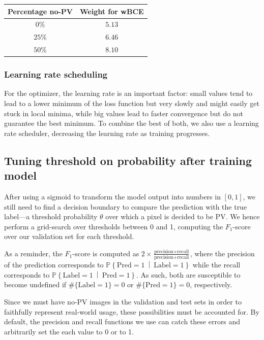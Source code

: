 \documentclass[10pt,conference]{IEEEtran}
\renewcommand\P[1]{\mathbb{P}\!\left\{#1\right\}}
\newcommand\given{\:\middle|\:}
\newcommand\tl[1]{\{\text{Label} = #1\}}
\newcommand\pl[1]{\{\text{Pred} = #1\}}
\begin{document}
\begin{center}
    \begin{tabular}{||c | c||} 
        \hline
        Percentage no-PV & Weight for wBCE\\ [0.5ex] 
        \hline\hline
        $0\%$ & $5.13$ \\
        \hline
        $25\%$ & $6.46$ \\
        \hline
        $50\%$ & $8.10$ \\
        \hline
    \end{tabular}
\end{center}

\subsubsection{Learning rate scheduling}
For the optimizer, the learning rate is an important factor:
small values tend to lead to a lower minimum of the loss function but very slowly and might easily get stuck in local minima, while big values lead to faster convergence but do not guarantee the best minimum.
To combine the best of both, we also use a learning rate scheduler, decreasing the learning rate as training progresses.

\subsection{Tuning threshold on probability after training model} \label{ssec:threshold}
After using a sigmoid to transform the model output into numbers in $[0,1]$, 
we still need to find a decision boundary to compare the prediction with the true label---a threshold probability $\theta$ over which a pixel is decided to be PV.
We hence perform a grid-search over thresholds between 0 and 1, computing the $F_1$-score over our validation set 
for each threshold.


As a reminder,
the $F_1$-score is computed as $2 \times \frac{\text{precision} \times \text{recall}}{\text{precision} + \text{recall}}$,
where the precision of the prediction
corresponds to $\P{\text{Pred}=1 \given \text{Label} = 1}$ while
the recall corresponds to $\P{\text{Label}=1 \given \text{Pred} = 1}$.
As such, both are susceptible to become undefined if
$\#\tl1 = 0$ or $\#\pl1 = 0$, respectively.

Since we must have no-PV images in the validation and test sets in order to faithfully represent real-world usage,
these possibilities must be accounted for.
By default, the precision and recall functions we use
can catch these errors and arbitrarily set the each value to
0 or to 1.
\end{document}
